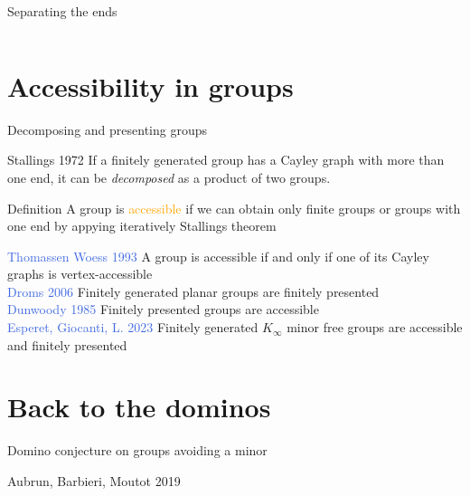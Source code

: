 \documentclass[11pt,dvipsnames,presentation,aspectratio=169]{beamer}
\newcommand{\myorange}{Orange}
\newcommand{\myblue}{RoyalBlue}
\newcommand{\define}[1]{\textcolor{\myorange}{#1}}
\newcommand{\thm}[1]{\textcolor{\myblue}{#1}}
\begin{document}
\begin{frame}{Separating the ends}
\begin{columns}
\begin{column}{.3\linewidth}
\begin{tikzpicture}
      \end{tikzpicture}
      
      \vspace{.5cm}
      \centering
    \end{column}
  \end{columns}
\end{frame}

\section*{Accessibility in groups}
\begin{frame}{Decomposing and presenting groups}
  \begin{block}{Stallings 1972}
    If a finitely generated group has a Cayley graph with more than one end, it
    can be \emph{decomposed} as a product of two groups.
  \end{block}

  \begin{exampleblock}{Definition}
    A group is \define{accessible} if we can obtain only finite groups or groups with one
    end by appying iteratively Stallings theorem
  \end{exampleblock}
  \pause
  \thm{Thomassen Woess 1993} A group is accessible if and only if one of its
  Cayley graphs is vertex-accessible\\
  \pause
  \thm{Droms 2006} Finitely generated planar groups are finitely presented\\ 
  \thm{Dunwoody 1985} Finitely presented groups are accessible\\
  \pause
  \thm{Esperet, Giocanti, L. 2023} Finitely generated $K_\infty$ minor free
  groups are accessible and finitely presented
\end{frame}

\section*{Back to the dominos}
\begin{frame}{Domino conjecture on groups avoiding a minor}
  \begin{block}{Aubrun, Barbieri, Moutot 2019}
  \end{block}
\end{frame}
\end{document}
